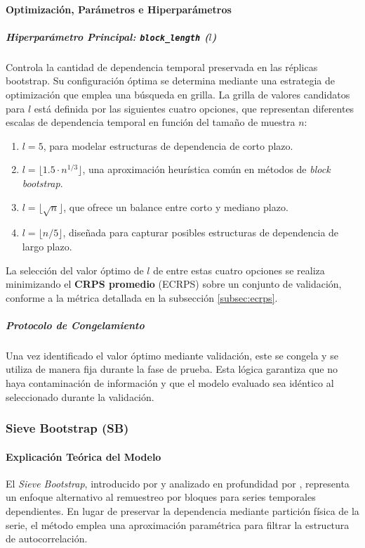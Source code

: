 \paragraph{Optimización, Parámetros e Hiperparámetros}
\subparagraph{Hiperparámetro Principal: \texttt{block\_length} ($l$)}
Controla la cantidad de dependencia temporal preservada en las réplicas bootstrap. Su configuración óptima se determina mediante una estrategia de optimización que emplea una búsqueda en grilla. La grilla de valores candidatos para $l$ está definida por las siguientes cuatro opciones, que representan diferentes escalas de dependencia temporal en función del tamaño de muestra $n$:

\begin{enumerate}
    \item $l = 5$, para modelar estructuras de dependencia de corto plazo.
    \item $l = \lfloor 1.5 \cdot n^{1/3} \rfloor$, una aproximación heurística común en métodos de \textit{block bootstrap}.
    \item $l = \lfloor \sqrt{n} \rfloor$, que ofrece un balance entre corto y mediano plazo.
    \item $l = \lfloor n / 5 \rfloor$, diseñada para capturar posibles estructuras de dependencia de largo plazo.
\end{enumerate}

La selección del valor óptimo de $l$ de entre estas cuatro opciones se realiza minimizando el \textbf{CRPS promedio} (ECRPS) sobre un conjunto de validación, conforme a la métrica detallada en la subsección \ref{subsec:ecrps}.

\subparagraph{Protocolo de Congelamiento}
Una vez identificado el valor óptimo mediante validación, este se congela y se utiliza de manera fija durante la fase de prueba. Esta lógica garantiza que no haya contaminación de información y que el modelo evaluado sea idéntico al seleccionado durante la validación.


\subsubsection{Sieve Bootstrap (SB)}
\label{subsec:SB}
\paragraph{Explicación Teórica del Modelo}

El \textit{Sieve Bootstrap}, introducido por \textcite{Buhlmann1997} y analizado en profundidad por \textcite{Lahiri2003}, representa un enfoque alternativo al remuestreo por bloques para series temporales dependientes. En lugar de preservar la dependencia mediante partición física de la serie, el método emplea una aproximación paramétrica para filtrar la estructura de autocorrelación.

